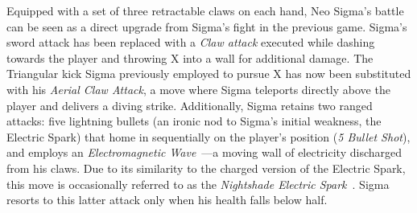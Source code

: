 Equipped with a set of three retractable claws on each hand, Neo Sigma's battle can be seen as a direct upgrade from Sigma's fight in the previous game. Sigma's sword attack has been replaced with a \emph{Claw attack} executed while dashing towards the player and throwing X into a wall for additional damage. The Triangular kick Sigma previously employed to pursue X has now been substituted with his \emph{Aerial Claw Attack}, a move where Sigma teleports directly above the player and delivers a diving strike. Additionally, Sigma retains two ranged attacks: five lightning bullets (an ironic nod to Sigma's initial weakness, the Electric Spark) that home in sequentially on the player's position (\emph{5 Bullet Shot}), and employs an \emph{Electromagnetic Wave}~\cite{book:Compendium}—a moving wall of electricity discharged from his claws. Due to its similarity to the charged version of the Electric Spark, this move is occasionally referred to as the \textit{Nightshade Electric Spark}~\cite{book:MH_field_guide}. Sigma resorts to this latter attack only when his health falls below half.
